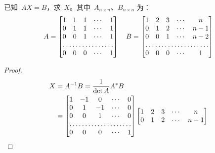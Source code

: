 \documentclass[twoside,openright]{book}
\begin{document}
\begin{CJK*}{UTF8}{}
\begin{quest}
\label{quest:104}
已知\ $AX=B$，求\ $X$。其中\ $A_{n \times n}$、$B_{n \times n}$ 为：
\[
A=
\begin{bmatrix}
1               & 1               & 1               & \cdots & 1                 \\
0               & 1               & 1               & \cdots & 1                 \\
0               & 0               & 1               & \cdots & 1                 \\
\hdotsfor{5}                                                                     \\
0               & 0               & 0               & \cdots & 1
\end{bmatrix}
\quad
B=
\begin{bmatrix}
1               & 2               & 3               & \cdots & n                 \\
0               & 1               & 2               & \cdots & n-1               \\
0               & 0               & 1               & \cdots & n-2               \\
\hdotsfor{5}                                                                     \\
0               & 0               & 0               & \cdots & 1
\end{bmatrix}
\]
\end{quest}
\begin{proof}
\begin{align*}
X&=A^{-1}B=\frac{1}{\det A}A^*B \\ &=\begin{bmatrix}
1               & -1               & 0               & \cdots & 0                 \\
0               & 1                & -1              & \cdots & 0                \\
0               & 0                & 1               & \cdots & 0                 \\
\hdotsfor{5}                                                                     \\
0               & 0               & 0               & \cdots & 1
\end{bmatrix}\begin{bmatrix}
1               & 2               & 3               & \cdots & n                 \\
0               & 1               & 2               & \cdots & n-1               \\

\end{bmatrix}
\end{align*}
\end{proof}
\end{CJK*}
\end{document}
